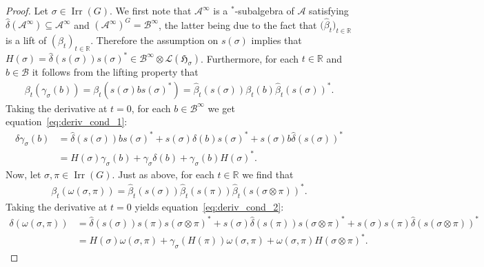 \documentclass[pdftex]{sigma}
\numberwithin{equation}{section}
\newcommand*{\R}{\mathbb R}		%
\newcommand*{\tensor}{\otimes}		%
\newcommand*{\Star}{$^*$\nobreakdash}
\newcommand*{\hilb}{\mathfrak}		%
\newcommand*{\alg}{\mathcal}		%
\newcommand*{\hH}{\hilb{H}}			%
\newcommand*{\aA}{\alg{A}}			%
\newcommand*{\aB}{\alg{B}} 			%
\newcommand*{\End}{\mathcal{L}} %
\DeclareMathOperator{\Irrep}{Irr} 			%
\begin{document}
\begin{proof}
	Let $\sigma \in \Irrep(G)$.
	We first note that $\aA^\infty$ is a \Star-subalgebra of $\aA$ satisfying $\hat \delta(\aA^\infty) \subseteq \aA^\infty$ and $(\aA^\infty)^G = \aB^\infty$, the latter being due to the fact that $\big(\hat \beta_t\big)_{t \in \R}$ is a lift of $(\beta_t)_{t \in \R}$.
	Therefore the assumption on $s(\sigma)$ implies that $H(\sigma) = \hat \delta ( s(\sigma) ) s(\sigma)^* \in \aB^\infty \tensor \End(\hH_\sigma)$.
	Furthermore, for each $t \in \R$ and $b \in \aB$ it follows from the lifting property that
	\begin{gather*}
		\beta_t ( \gamma_\sigma(b) )
		= \beta_t ( s(\sigma) b s(\sigma)^* )
		= \hat\beta_t ( s(\sigma) ) \beta_t(b) \hat\beta_t ( s(\sigma) )^*.
	\end{gather*}
	Taking the derivative at $t=0$, for each $b \in \aB^\infty$ we get equation~\eqref{eq:deriv_cond_1}:
	\begin{align*}
		\delta \gamma_\sigma(b)
		&=
		\hat \delta ( s(\sigma) ) b s(\sigma)^* + s(\sigma) \delta(b) s(\sigma)^* + s(\sigma) b \hat \delta ( s(\sigma) )^*
		\\
		&= H(\sigma) \gamma_\sigma(b) + \gamma_\sigma \delta(b) + \gamma_\sigma(b) H(\sigma)^*.
	\end{align*}
	Now, let $\sigma, \pi \in \Irrep(G)$.
	Just as above, for each $t \in \R$ we find that
	\begin{gather*}
		\beta_t ( \omega(\sigma, \pi) )
		= \hat \beta_t ( s(\sigma) ) \hat\beta_t ( s(\pi) ) \hat\beta_t ( s(\sigma \tensor \pi) )^*.
	\end{gather*}
	Taking the derivative at $t=0$ yields equation~\eqref{eq:deriv_cond_2}:
	\begin{align*}
		\delta ( \omega(\sigma, \pi) )
		&=
		\hat \delta ( s(\sigma) ) s(\pi) s(\sigma \tensor \pi)^*
		+ s(\sigma) \hat \delta ( s(\pi) ) s(\sigma \tensor \pi)^*
		+ s(\sigma) s(\pi) \hat \delta ( s(\sigma \tensor \pi) )^*
		\\
		&=
		H(\sigma) \omega(\sigma, \pi)
		+ \gamma_\sigma ( H(\pi) ) \omega(\sigma, \pi)
		+ \omega(\sigma, \pi) H(\sigma \tensor \pi)^*.
		\tag*{\qed}	
	\end{align*}
	\renewcommand{\qed}{}
\end{proof}
\end{document}
